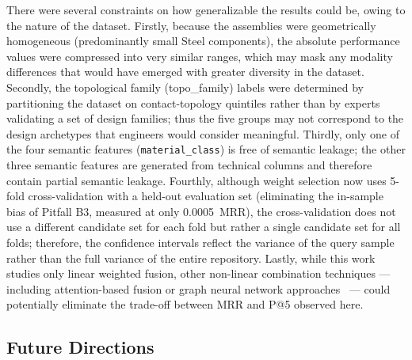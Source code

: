 \documentclass[preprint,12pt]{elsarticle}
\begin{document}
There were several constraints on how generalizable the results could be, owing to the nature of the dataset.
Firstly, because the assemblies were geometrically homogeneous (predominantly small Steel components), the absolute performance values were compressed into very similar ranges, which may mask any modality differences that would have emerged with greater diversity in the dataset.
Secondly, the topological family (topo\_family) labels were determined by partitioning the dataset on contact-topology quintiles rather than by experts validating a set of design families; thus the five groups may not correspond to the design archetypes that engineers would consider meaningful.
Thirdly, only one of the four semantic features (\texttt{material\_class}) is free of semantic leakage; the other three semantic features are generated from technical columns and therefore contain partial semantic leakage.
Fourthly, although weight selection now uses 5-fold cross-validation with a held-out evaluation set (eliminating the in-sample bias of Pitfall B3, measured at only 0.0005~MRR), the cross-validation does not use a different candidate set for each fold but rather a single candidate set for all folds; therefore, the confidence intervals reflect the variance of the query sample rather than the full variance of the entire repository.
Lastly, while this work studies only linear weighted fusion, other non-linear combination techniques --- including attention-based fusion or graph neural network approaches~\cite{Quan2024} --- could potentially eliminate the trade-off between MRR and P@5 observed here.

\subsection{Future Directions}
\end{document}
